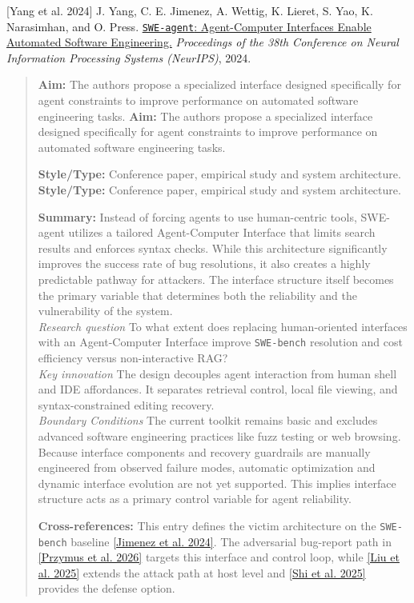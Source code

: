 \documentclass[11pt, a4paper]{article}
\begin{document}
\newpage
\noindent \hypertarget{p7}{[Yang et al. 2024]} J. Yang, C. E. Jimenez, A. Wettig, K. Lieret, S. Yao, K. Narasimhan, and O. Press. \href{https://arxiv.org/abs/2405.15793}{\texttt{SWE-agent}: Agent-Computer Interfaces Enable Automated Software Engineering.} \textit{Proceedings of the 38th Conference on Neural Information Processing Systems (NeurIPS)}, 2024.
\begin{quote}
\textbf{Aim:} The authors propose a specialized interface designed specifically for agent constraints to improve performance on automated software engineering tasks.
\textbf{Aim:} The authors propose a specialized interface designed specifically for agent constraints to improve performance on automated software engineering tasks.

\vspace{0.5em}
\textbf{Style/Type:} Conference paper, empirical study and system architecture.
\textbf{Style/Type:} Conference paper, empirical study and system architecture.

\vspace{0.5em}
\textbf{Summary:} Instead of forcing agents to use human-centric tools, SWE-agent utilizes a tailored Agent-Computer Interface that limits search results and enforces syntax checks. While this architecture significantly improves the success rate of bug resolutions, it also creates a highly predictable pathway for attackers. The interface structure itself becomes the primary variable that determines both the reliability and the vulnerability of the system. \\ \textit{Research question} To what extent does replacing human-oriented interfaces with an Agent-Computer Interface improve \texttt{SWE-bench} resolution and cost efficiency versus non-interactive RAG? \\ \textit{Key innovation} The design decouples agent interaction from human shell and IDE affordances. It separates retrieval control, local file viewing, and syntax-constrained editing recovery. \\ \textit{Boundary Conditions} The current toolkit remains basic and excludes advanced software engineering practices like fuzz testing or web browsing. Because interface components and recovery guardrails are manually engineered from observed failure modes, automatic optimization and dynamic interface evolution are not yet supported. This implies interface structure acts as a primary control variable for agent reliability.

\vspace{0.5em}
\textbf{Cross-references:} This entry defines the victim architecture on the \texttt{SWE-bench} baseline \hyperlink{p2}{[Jimenez et al. 2024]}. The adversarial bug-report path in \hyperlink{p4}{[Przymus et al. 2026]} targets this interface and control loop, while \hyperlink{p3}{[Liu et al. 2025]} extends the attack path at host level and \hyperlink{p5}{[Shi et al. 2025]} provides the defense option.


\end{quote}
\end{document}
